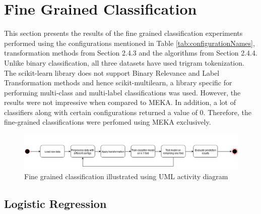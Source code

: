 \documentclass[a4paper,12pt,twoside]{report}
\begin{document}
\section{Fine Grained Classification}
This section presents the results of the fine grained classification experiments performed using the configurations mentioned in Table \ref{tab:configurationNames}, transformation methods from Section 2.4.3 and the algorithms from Section 2.4.4. Unlike  binary classification, all three datasets have used trigram tokenization. The scikit-learn library does not support Binary Relevance and Label Transformation methods and hence scikit-multilearn, a library specific for performing multi-class and multi-label classifications was used. However, the results were not impressive when compared to MEKA. In addition, a lot of classifiers along with certain configurations returned a value of 0. Therefore, the fine-grained classifications were perfomed using MEKA exclusively. 

\begin{figure}[h] %
    \centering
    \includegraphics[width=14cm]{fine-grained-classification}
    \caption{Fine grained classification illustrated using UML activity diagram}
    \label{fig:finegrainedClass}
\end{figure}

\subsection{Logistic Regression}
\end{document}
